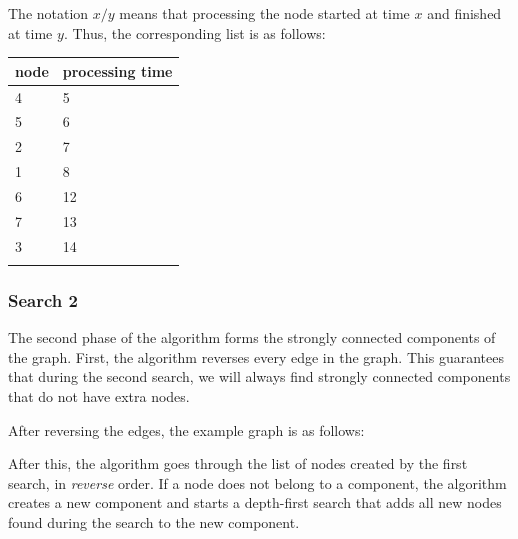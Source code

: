 The notation $x/y$ means that
processing the node started
at time $x$ and finished at time $y$.
Thus, the corresponding list is as follows:

\begin{tabular}{ll}
\\
node & processing time \\
\hline
4 & 5 \\
5 & 6 \\
2 & 7 \\
1 & 8 \\
6 & 12 \\
7 & 13 \\
3 & 14 \\
\\
\end{tabular}
% 

\subsubsection{Search 2}

The second phase of the algorithm
forms the strongly connected components
of the graph.
First, the algorithm reverses every
edge in the graph.
This guarantees that during the second search,
we will always find strongly connected
components that do not have extra nodes.

After reversing the edges,
the example graph is as follows:
\begin{center}
\end{center}

After this, the algorithm goes through
the list of nodes created by the first search,
in \emph{reverse} order.
If a node does not belong to a component,
the algorithm creates a new component
and starts a depth-first search
that adds all new nodes found during the search
to the new component.

